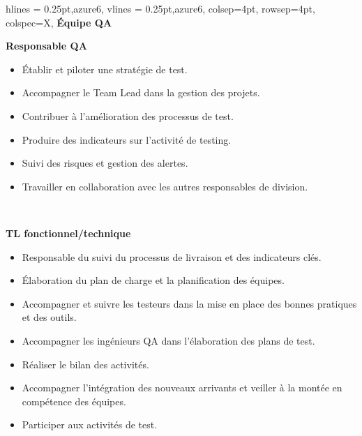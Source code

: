 \begin{longtblr}[caption={Responsabilités et missions des différents acteurs de l'équipe QA}, label={tab:qa}]{
    hlines = {0.25pt,azure6},
    vlines = {0.25pt,azure6},
    colsep=4pt,
    rowsep=4pt,
	colspec={X},
}
\textbf{Équipe QA}\\

\begin{minipage}{\linewidth}
{\color{actGreen}
\textbf{Responsable QA}\\
}
 \begin{itemize}
     \item Établir et piloter une stratégie de test.
     \item Accompagner le Team Lead dans la gestion des projets.
     \item Contribuer à l'amélioration des processus de test.
     \item Produire des indicateurs sur l’activité de testing.
     \item Suivi des risques et gestion des alertes.
     \item Travailler en collaboration avec les autres responsables de division.\\
 \end{itemize}
\end{minipage}\\
\begin{minipage}{\linewidth}
    {
    \color{actBlue}\textbf{TL fonctionnel/technique}\\
    }
    \begin{itemize}
        \item Responsable du suivi du processus de livraison et des indicateurs clés.
        \item Élaboration du plan de charge et la planification des équipes.
        \item Accompagner et suivre les testeurs dans la mise en place des bonnes pratiques et des outils.
        \item Accompagner les ingénieurs QA dans l'élaboration des plans de test.
        \item Réaliser le bilan des activités.
        \item Accompagner l'intégration des nouveaux arrivants et veiller à la montée en compétence des équipes.
        \item Participer aux activités de test.\\
    \end{itemize}
    \end{minipage}\\

\end{longtblr}
